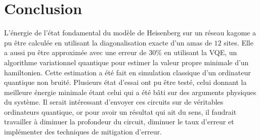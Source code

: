 \documentclass[../main.tex]{subfiles}
\begin{document}
  \section*{Conclusion}
  L'énergie de l'état fondamental du modèle de Heisenberg sur un réseau kagome
  a pu être calculée en utilisant la diagonalisation exacte d'un amas de $12$ sites.
  Elle a aussi pu être approximée avec une erreur de $30\%$ en utilisant la
  VQE, un algorithme variationnel quantique pour estimer la valeur propre minimale
  d'un hamiltonien. Cette estimation a été fait en simulation classique d'un
  ordinateur quantique non bruité. Plusieurs état d'essai ont pu être testé,
  celui donnant la meilleure énergie minimale étant celui qui a été bâti sur
  des arguments physiques du système. Il serait intéressant d'envoyer ces
  circuits sur de véritables ordinateurs quantique, or pour avoir un résultat
  qui ait du sens, il faudrait travailler à diminuer la profondeur du circuit,
  diminuer le taux d'erreur et implémenter des techniques de mitigation d'erreur.
\end{document}
